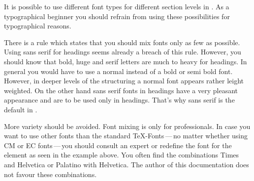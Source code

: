 \begin{Explain}
  It is possible to use different font types for different section levels
  in {\KOMAScript}. As a typographical beginner you should refrain from
  using these possibilities for typographical reasons.

  There is a rule which states that you should mix fonts only as few as
  possible. Using sans serif for headings seems already a breach of this
  rule. However, you should know that bold, huge and serif letters are much to
  heavy for headings. In general you would have to use a normal instead of a
  bold or semi bold font. However, in deeper levels of the structuring a
  normal font appears rather leight weighted. On the other hand sans serif
  fonts in headings have a very pleasant appearance and are to be used only in
  headings. That's why sans serif is the default in {\KOMAScript}. 

  More variety should be avoided. Font mixing is only for professionals. In
  case you want to use other fonts than the standard \TeX-Fonts\,---\,no matter
  whether using CM  or EC fonts\,---\,you should
  consult an expert or redefine the font for the element
   as seen in the example
  above. You often find the combinations Times and Helvetica or Palatino with
  Helvetica. The author of this documentation does not favour these
  combinations.
\end{Explain}
%
%
%
%
%
%
%
%
%
%



